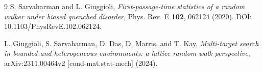 \documentclass[11pt]{article}
\begin{document}
\begin{thebibliography}{9}
S. Sarvaharman and L. Giuggioli,
\emph{First-passage-time statistics of a random walker under biased quenched disorder},
Phys. Rev. E \textbf{102}, 062124 (2020).
DOI: 10.1103/PhysRevE.102.062124.

L. Giuggioli, S. Sarvaharman, D. Das, D. Marris, and T. Kay,
\emph{Multi-target search in bounded and heterogeneous environments: a lattice random walk perspective},
arXiv:2311.00464v2 [cond-mat.stat-mech] (2024).
\end{thebibliography}
\end{document}
